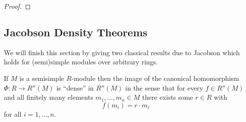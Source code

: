 \begin{proof}
\end{proof}







\subsection{Jacobson Density Theorems}
\label{subsection: Jacobson Density Theorems}


\begin{fluff}
  We will finish this section by giving two classical results due to Jacobson which holds for (semi)simple modules over arbitrary rings.
\end{fluff}


\begin{theorem}
  \label{theorem: first jacobson density theorem}
  If $M$ is a semisimple $R$-module then the image of the canonical homomorphism $\Phi \colon R \to R''(M)$ is \enquote{dense} in $R''(M)$ in the sense that for every $f \in R''(M)$ and all finitely many elements $m_1, \dotsc, m_n \in M$ there exists some $r \in R$ with
  \[
      f(m_i)
    = r \cdot m_i
  \]
  for all $i = 1, \dotsc, n$.
\end{theorem}



